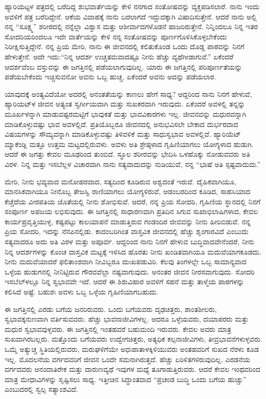 ಹ್ಯಾರಿಯಟ್ಟಳ ಪತ್ರದಲ್ಲಿ ಬರೆದಿದ್ದ ಶುಭವಾರ್ತೆಯನ್ನು ಕೇಳಿ ನನಗಾದ ಸಂತೋಷವನ್ನು ವ್ಯಕ್ತಪಡಿಸಲಾರೆ. ನಾನು ಇಂದು ಅವಳಿಗೆ ಪತ್ರ ಬರೆದಿದ್ದೇನೆ. ಆಕೆಯ ವಿವಾಹಕ್ಕೆ ನಾನು ಬರಲಾಗದೆ ಇದ್ದುದಕ್ಕಾಗಿ ವಿಷಾದಿಸುತ್ತೇನೆ. ಆದರೆ ನಾನು ಅಲ್ಲಿ ನನ್ನ “ಸೂಕ್ಷ್ಮ” ಶರೀರದಲ್ಲಿ ನನ್ನೆಲ್ಲಾ ವಿಶ್ವಾಸ ಮತ್ತು ಆಶೀರ್ವಾದಗಳೊಡನೆ ಹಾಜರಿರುತ್ತೇನೆ. ನಿನ್ನಿಂದಲೂ ನಿನ್ನ ಇತರ ಸೋದರಿಯರಿಂದಲೂ ಇದೇ ವಾರ್ತೆಯನ್ನು ಕೇಳಿ ನನ್ನ ಸಂತೋಷವನ್ನು ಪೂರ್ಣಗೊಳಿಸಿಕೊಳ್ಳಬೇಕೆಂದು ನಿರೀಕ್ಷಿಸುತ್ತಿದ್ದೇನೆ. ನನ್ನ ಪ್ರಿಯ ಮೇರಿ, ನಾನು ಈ ಜೀವನದಲ್ಲಿ ಕಲಿತುಕೊಂಡ ಒಂದು ದೊಡ್ಡ ಪಾಠವನ್ನು ನಿನಗೆ ಹೇಳುತ್ತೇನೆ. ಅದೇ ಇದು:\break “ನಿನ್ನ ಆದರ್ಶ ಉಚ್ಚತಮವಾದಷ್ಟೂ ನೀನು ಹೆಚ್ಚು ವ್ಯಥೆಗೀಡಾಗುವೆ.” ಏಕೆಂದರೆ ಆದರ್ಶವೆಂಬ ವಸ್ತುವನ್ನು ಈ ಜಗತ್ತಿನಲ್ಲಿ ಪಡೆಯಲಾಗುವುದಿಲ್ಲ. ಯಾರು ಈ ಜಗತ್ತಿನಲ್ಲಿ ಪರಿಪೂರ್ಣತೆಯನ್ನು ಪಡೆಯಬೇಕೆಂದು ಇಚ್ಚಿಸುವನೋ ಅವನು ಒಬ್ಬ ಹುಚ್ಚ. ಏಕೆಂದರೆ ಅವನು ಅದನ್ನು ಪಡೆಯಲಾರ.

ಯಾವುದಕ್ಕೆ ಅಂತ್ಯವಿದೆಯೋ ಅದರಲ್ಲಿ ಅನಂತತೆಯನ್ನು ಕಾಣಲು ಹೇಗೆ ಸಾಧ್ಯ? ಆದ್ದರಿಂದ ನಾನು ನಿನಗೆ ಹೇಳುವೆ, ಹ್ಯಾರಿಯಟ್‌ಳ ಜೀವನ ಅತ್ಯಂತ ಸ್ವರ್ಗೀಯವಾಗಿ ಮತ್ತು ಸುಖಕರವಾಗಿ ಇರುವುದು. ಏಕೆಂದರೆ ಅವಳಲ್ಲಿ ತನ್ನನ್ನು ಮೂರ್ಖಳನ್ನಾಗಿ ಮಾಡುವಷ್ಟರಮಟ್ಟಿಗೆ ಭಾವುಕತೆ ಮತ್ತು ಭಾವವಿಕಾರಗಳು ಇಲ್ಲ. ಜೀವನವನ್ನು ಮಧುರವನ್ನಾಗಿ ಮಾಡಿಕೊಳ್ಳುವಷ್ಟು ಭಾವ ಅವಳಲ್ಲಿದೆ. ಪ್ರತಿಯೊಬ್ಬರೂ ಜೀವನದಲ್ಲಿ ಅನುಭವಿಸಲೇ ಬೇಕಾದ ದುರ್ಭರವಾದ ವಿಷಯಗಳನ್ನು ಸೌಮ್ಯವನ್ನಾಗಿ ಮಾಡಿಕೊಳ್ಳುವಷ್ಟು ತಿಳಿವಳಿಕೆ ಮತ್ತು ಸಾಧುಸ್ವಭಾವ ಅವಳಲ್ಲಿವೆ. ಹ್ಯಾರಿಯೆಟ್ ಮ್ಯಾಕೆಂಡ್ಲಿ ಮತ್ತೂ ಉತ್ತಮ ಮಟ್ಟದಲ್ಲಿರುವಳು. ಅವಳು ಅತಿ ಶ್ರೇಷ್ಠಳಾದ ಗೃಹಿಣಿಯಾಗಲು ಯೋಗ್ಯಳಾದ ಹುಡುಗಿ. ಆದರೆ ಈ ಜಗತ್ತು ಕೇವಲ ಮೂಢರಿಂದ ತುಂಬಿದೆ. ಸ್ಥೂಲ ಶರೀರವನ್ನು ಭೇದಿಸಿ ಒಳಹೊಕ್ಕು ನೋಡುವವರು ಅತಿ ವಿರಳ. ನಿನ್ನ ಮತ್ತು ಇಸಬೆಲ್ಲಳ ವಿಚಾರವಾಗಿ ನಾನು ಸತ್ಯವಾದುದನ್ನು ನುಡಿಯುವೆ, ನನ್ನ “ಭಾಷೆ ಅತಿ ಸ್ಪಷ್ಟವಾದುದು.”

ಮೇರಿ, ನೀನು ಭವ್ಯವಾದ ಮನೋಹರವಾದ, ಸತ್ಯದಿಂದ ಕೂಡಿರುವ ಅಶ್ವದಂತೆ ಇರುವೆ. ದೈಹಿಕವಾಗಿಯೂ, ಮಾನಸಿಕವಾಗಿಯೂ ನೀನೊಬ್ಬ ತೇಜಸ್ವಿ ರಾಣಿಯಾಗಲು ಯೋಗ್ಯಳಿರುವೆ, ಆಡಂಬರದಿಂದ ಕೂಡಿದ, ಸಾಹಸಿಯಾದ ಕೆಚ್ಚೆದೆಯ ವೀರಪತಿಯ ಜೊತೆಯಲ್ಲಿ ನೀನು ಶೋಭಿಸುವೆ. ಆದರೆ, ನನ್ನ ಪ್ರಿಯ ಸೋದರಿ, ಗೃಹಿಣಿಯ ಸ್ಥಾನದಲ್ಲಿ ನಿನಗೆ ಸಂಪೂರ್ಣ ಅಪಜಯ ಲಭಿಸುವುದು. ಈ ಜಗತ್ತಿನಲ್ಲಿ ಸಾಧಾರಣವಾಗಿ ಪ್ರತಿದಿನ ಸಿಗುವ ಸುಖಾಭಿಲಾಷಿಗಳಾದ, ಕೇವಲ ಕಾರ್ಯಪ್ರವೃತ್ತಿಯುಳ್ಳ, ಕಷ್ಟಪಟ್ಟು ಕಾಲಯಾಪನೆ ಮಾಡುತ್ತಿರುವ ಗಂಡಂದಿರ ಜೀವವನ್ನು ನೀನು ಹೀರಿಬಿಡುವೆ. ನನ್ನ ಪ್ರಿಯ ಸೋದರಿ, ಇದನ್ನು ನೆನಪಿನಲ್ಲಿಡು. ಕಾದಂಬರಿಗಿಂತ ವಾಸ್ತವಿಕ ಜೀವನದಲ್ಲಿ ಹೆಚ್ಚು ಶೃಂಗಾರವಿದೆ ಎಂಬುದು ಸತ್ಯವಾದರೂ ಅದು ಅತಿ ವಿರಳ ಮತ್ತು ಅಪೂರ್ವ. ಆದ್ದರಿಂದ ನಾನು ನಿನಗೆ ಹೇಳುವ ಬುದ್ಧಿವಾದವೇನೆಂದರೆ, ನೀನು ನಿನ್ನ ಆದರ್ಶಗಳನ್ನು ಕೊಂಚ ವಾಸ್ತವಿಕ ಮಟ್ಟಕ್ಕೆ ಇಳಿಸಿದ ಹೊರತು ನೀನು ಖಂಡಿತವಾಗಿಯೂ ಮದುವೆಯಾಗಕೂಡದು. ನೀನು ಮದುವೆಯಾದರೆ ಫಲಿತಾಂಶವಾಗಿ ನೀವಿಬ್ಬರೂ ದುಃಖಪಡುವಿರಿ. ಕೆಲವು ತಿಂಗಳಲ್ಲೇ ಒಬ್ಬ ಸಾಮಾನ್ಯವಾದ ಒಳ್ಳೆಯ ಹುಡುಗನಲ್ಲಿ ನೀನಿಟ್ಟಿರುವ ಗೌರವವೆಲ್ಲಾ ನಷ್ಟವಾಗುವುದು. ಅನಂತರ ಜೀವನ ನೀರಸವಾಗುವುದು. ಸೋದರಿ ಇಸಬೆಲ್‌ಳಲ್ಲೂ ನಿನ್ನ ಸ್ವಭಾವವೇ ಇದೆ. ಆದರೆ ಈ ಶಿಶುವಿಹಾರ ಅವಳಿಗೆ ಸಹನೆ ಮತ್ತು ತಾಳ್ಮೆಯ ಪಾಠಗಳನ್ನು ಕಲಿಸಿದೆ ಅಷ್ಟೆ. ಬಹುಶಃ ಅವಳು ಒಬ್ಬ ಒಳ್ಳೆಯ ಗೃಹಿಣಿಯಾಗಬಹುದು.
\newpage

ಈ ಜಗತ್ತಿನಲ್ಲಿ ಎರಡು ಬಗೆಯ ಜನರಿರುವರು. ಒಂದು ಬಗೆಯವರು ದೃಢಚಿತ್ತರು, ಶಾಂತಶೀಲರು, ಸ್ವಭಾವಕ್ಕನುಣವಾಗಿ ವರ್ತಿಸುವವರು. ಹೆಚ್ಚು ಭಾವನಾಜೀವಿಗಳಲ್ಲ. ಆದರೂ ಒಳ್ಳೆಯವರು, ದಯಾಪರರು ಮತ್ತು ಮಧುರ ಸ್ವಭಾವವುಳ್ಳವರು. ಈ ಜಗತ್ತಿನಲ್ಲಿ ಇಂತಹವರೆ ಬಹುಮಂದಿ ಇರುವರು. ಕೇವಲ ಅವರು ಮಾತ್ರ ಸುಖವಾಗಿರಬಲ್ಲರು. ಮತ್ತೊಂದು ಬಗೆಯವರು\enginline{-} ಉದ್ವೇಗಚಿತ್ತರು, ಅತ್ಯಧಿಕ ಕಲ್ಪನಾಜೀವಿಗಳು, ತೀವ್ರಭಾವನೆಗಳುಳ್ಳವರು. ಒಮ್ಮೆ ಅತ್ಯುಚ್ಚ ಸ್ಥಿತಿಯಲ್ಲಿರುವರು, ಮರುಘಳಿಗೆಯೇ ಅಧಃಪಾತಾಳಕ್ಕಿಳಿಯುವರು\enginline{-} ಅಂತಹವರಿಗೆ ಸುಖದ ನೆರಳು ಕೂಡ ಇಲ್ಲ. ಮೊದಲನೆಯ ವರ್ಗದವರಿಗೆ ಜೀವನ ಒಂದೇ ಸಮನಾಗಿರುತ್ತದೆ. ಹೆಚ್ಚು ಏರಿಳಿತಗಳಿರುವುದಿಲ್ಲ. ಎರಡನೆಯ ವರ್ಗದವರು ಆನಂದಾತಿರೇಕ ಮತ್ತು ದಾರುಣವ್ಯಥೆ ಇವುಗಳ ಮಧ್ಯೆ ತೂಗಾಡುತ್ತಿರುವರು. ಆದರೆ ಕೇವಲ ಇಂಥವರಿಂದ ಮಾತ್ರ ಮೇಧಾವಿಗಳನ್ನು ಸೃಷ್ಟಿಸಲು ಸಾಧ್ಯ. ಇತ್ತೀಚಿನ ಸಿದ್ಧಾಂತವಾದ “ಪ್ರಚಂಡ ಬುದ್ಧಿ ಒಂದು ಬಗೆಯ ಹುಚ್ಚು” ಎಂಬುದರಲ್ಲಿ ಸ್ವಲ್ಪ ಸತ್ಯಾಂಶವಿದೆ.

